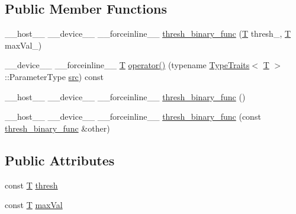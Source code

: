 \subsection*{Public Member Functions}
\begin{DoxyCompactItemize}
\item 
\-\_\-\-\_\-host\-\_\-\-\_\- \-\_\-\-\_\-device\-\_\-\-\_\- \-\_\-\-\_\-forceinline\-\_\-\-\_\- \hyperlink{structcv_1_1gpu_1_1device_1_1thresh__binary__func_ae984ea310436a82309da73819e1feb91}{thresh\-\_\-binary\-\_\-func} (\hyperlink{calib3d_8hpp_a3efb9551a871ddd0463079a808916717}{T} thresh\-\_\-, \hyperlink{calib3d_8hpp_a3efb9551a871ddd0463079a808916717}{T} max\-Val\-\_\-)
\item 
\-\_\-\-\_\-device\-\_\-\-\_\- \-\_\-\-\_\-forceinline\-\_\-\-\_\- \hyperlink{calib3d_8hpp_a3efb9551a871ddd0463079a808916717}{T} \hyperlink{structcv_1_1gpu_1_1device_1_1thresh__binary__func_a1d7a99a590223057d8d4aa05bdbb2e56}{operator()} (typename \hyperlink{structcv_1_1gpu_1_1device_1_1TypeTraits}{Type\-Traits}$<$ \hyperlink{calib3d_8hpp_a3efb9551a871ddd0463079a808916717}{T} $>$\-::Parameter\-Type \hyperlink{legacy_8hpp_a371cd109b74033bc4366f584edd3dacc}{src}) const 
\item 
\-\_\-\-\_\-host\-\_\-\-\_\- \-\_\-\-\_\-device\-\_\-\-\_\- \-\_\-\-\_\-forceinline\-\_\-\-\_\- \hyperlink{structcv_1_1gpu_1_1device_1_1thresh__binary__func_aee5df53c604142a9c75c49a828f0c0a0}{thresh\-\_\-binary\-\_\-func} ()
\item 
\-\_\-\-\_\-host\-\_\-\-\_\- \-\_\-\-\_\-device\-\_\-\-\_\- \-\_\-\-\_\-forceinline\-\_\-\-\_\- \hyperlink{structcv_1_1gpu_1_1device_1_1thresh__binary__func_a551de1fad5b9def42ff08b4467c3ee4b}{thresh\-\_\-binary\-\_\-func} (const \hyperlink{structcv_1_1gpu_1_1device_1_1thresh__binary__func}{thresh\-\_\-binary\-\_\-func} \&other)
\end{DoxyCompactItemize}
\subsection*{Public Attributes}
\begin{DoxyCompactItemize}
\item 
const \hyperlink{calib3d_8hpp_a3efb9551a871ddd0463079a808916717}{T} \hyperlink{structcv_1_1gpu_1_1device_1_1thresh__binary__func_a6facab7535ff2276d6d012d9327252bb}{thresh}
\item 
const \hyperlink{calib3d_8hpp_a3efb9551a871ddd0463079a808916717}{T} \hyperlink{structcv_1_1gpu_1_1device_1_1thresh__binary__func_ab20cbde1ae917f2ec9b14f2f21f13625}{max\-Val}
\end{DoxyCompactItemize}


